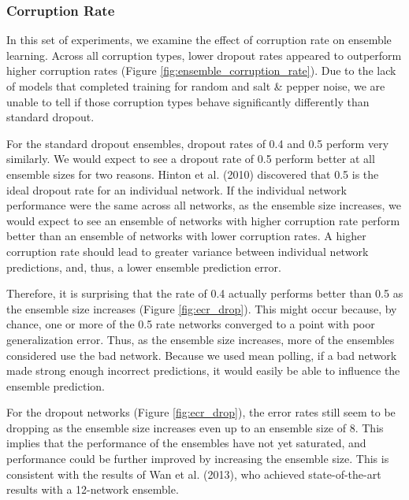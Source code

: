 \documentclass{article} %
\begin{document}
\subsubsection{Corruption Rate}

In this set of experiments, we examine the effect of corruption rate on ensemble learning. Across all corruption types, lower dropout rates appeared to outperform higher corruption rates (Figure \ref{fig:ensemble_corruption_rate}). Due to the lack of models that completed training for random and salt \& pepper noise, we are unable to tell if those corruption types behave significantly differently than standard dropout.

For the standard dropout ensembles, dropout rates of 0.4 and 0.5 perform very similarly. We would expect to see a dropout rate of 0.5 perform better at all ensemble sizes for two reasons. Hinton et al. (2010) discovered that 0.5 is the ideal dropout rate for an individual network. If the individual network performance were the same across all networks, as the ensemble size increases, we would expect to see an ensemble of networks with higher corruption rate perform better than an ensemble of networks with lower corruption rates. A higher corruption rate should lead to greater variance between individual network predictions, and, thus, a lower ensemble prediction error.

Therefore, it is surprising that the rate of 0.4 actually performs better than 0.5 as the ensemble size increases (Figure \ref{fig:ecr_drop}). This might occur because, by chance, one or more of the 0.5 rate networks converged to a point with poor generalization error. Thus, as the ensemble size increases, more of the ensembles considered use the bad network. Because we used mean polling, if a bad network made strong enough incorrect predictions, it would easily be able to influence the ensemble prediction.

For the dropout networks (Figure \ref{fig:ecr_drop}), the error rates still seem to be dropping as the ensemble size increases even up to an ensemble size of 8. This implies that the performance of the ensembles have not yet saturated, and performance could be further improved by increasing the ensemble size. This is consistent with the results of Wan et al. (2013), who achieved state-of-the-art results with a 12-network ensemble.
\end{document}
